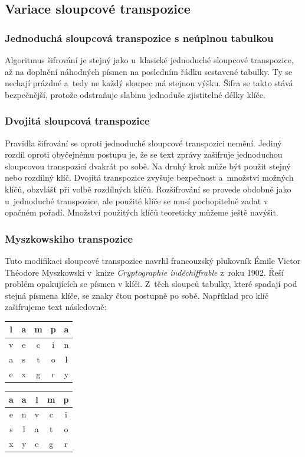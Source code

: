 \documentclass[glossaries, index]{kidiplom}
\begin{document}
\subsection{Variace sloupcové transpozice}
\subsubsection{Jednoduchá sloupcová transpozice s neúplnou tabulkou}
\label{transpozice-s-neuplnou-tabulkou}
Algoritmus šifrování je stejný jako u~klasické jednoduché sloupcové transpozice, až na doplnění náhodných písmen na posledním řádku sestavené tabulky. Ty se nechají prázdné a~tedy ne každý sloupec má stejnou výšku. Šifra se takto stává bezpečnější, protože odstraňuje slabinu jednoduše zjistitelné délky klíče.

\subsubsection{Dvojitá sloupcová transpozice}
Pravidla šifrování se oproti jednoduché sloupcové transpozici nemění. Jediný rozdíl oproti obyčejnému postupu je, že se  text zprávy zašifruje jednoduchou sloupcovou transpozicí dvakrát po sobě. Na druhý krok může být použit stejný nebo rozdílný klíč. Dvojitá transpozice zvyšuje bezpečnost a~množství možných klíčů, obzvlášť při volbě rozdílných klíčů. Rozšifrování se provede obdobně jako u~jednoduché transpozice, ale použité klíče se musí pochopitelně zadat v opačném pořadí. Množství použitých klíčů teoreticky můžeme ještě navýšit.

\subsubsection{Myszkowskiho transpozice}
Tuto modifikaci sloupcové transpozice navrhl francouzský plukovník Émile Victor Théodore Myszkowski v~knize \textit{Cryptographie indéchiffrable} z~roku 1902. Řeší problém opakujících se písmen v klíči. Z~těch sloupců tabulky, které spadají pod stejná písmena klíče, se znaky čtou postupně po sobě. Například pro klíč  zašifrujeme text  následovně:

\begin{center}
\begin{tabular}{ c c c c c }
  l & a & m & p & a \\ \hline \hline
  v & e & c & i & n \\
  a & s & t & o & l \\
  e & x & g & r & y \\
\end{tabular}
 \qquad \vline \qquad \enspace
\begin{tabular}{ c c c c c }
  a & a & l & m & p \\ \hline \hline
  e & n & v & c & i \\
  s & l & a & t & o \\
  x & y & e & g & r \\
\end{tabular}
\end{center}
	
\end{document}
